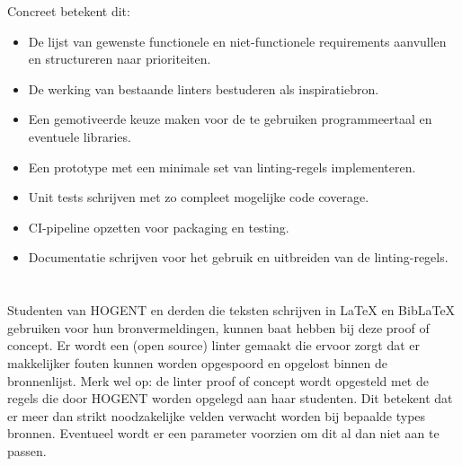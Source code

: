 Concreet betekent dit:
\begin{itemize}
  \item De lijst van gewenste functionele en niet-functionele requirements aanvullen en structureren naar prioriteiten.
  \item De werking van bestaande linters bestuderen als inspiratiebron.
  \item Een gemotiveerde keuze maken voor de te gebruiken programmeertaal en eventuele libraries.
  \item Een prototype met een minimale set van linting-regels implementeren.
  \item Unit tests schrijven met zo compleet mogelijke code coverage.
  \item CI-pipeline opzetten voor packaging en testing.
  \item Documentatie schrijven voor het gebruik en uitbreiden van de linting-regels.
\end{itemize}

\section{}%
\label{sec:probleemstelling}

Studenten van HOGENT en derden die teksten schrijven in \LaTeX{} en BibLaTeX gebruiken voor hun bronvermeldingen, kunnen baat hebben bij deze proof of concept. Er wordt een (open source) linter gemaakt die ervoor zorgt dat er makkelijker fouten kunnen worden opgespoord en opgelost binnen de bronnenlijst. Merk wel op: de linter proof of concept wordt opgesteld met de regels die door HOGENT worden opgelegd aan haar studenten. Dit betekent dat er meer dan strikt noodzakelijke velden verwacht worden bij bepaalde types bronnen. Eventueel wordt er een parameter voorzien om dit al dan niet aan te passen.



